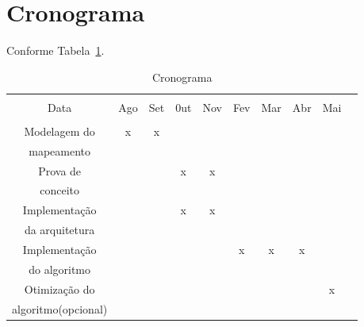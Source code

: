 \section{Cronograma}

Conforme Tabela~\ref{tab:crono}.
\begin{table}[Ht!]
   \begin{center}
     \begin{tabular}{|c|c|c|c|c|c|c|c|c|c|}
       \hline
                         &      &     &     &     &     &     &     &         \\
           Data          &  Ago & Set & 0ut & Nov & Fev & Mar & Abr & Mai      \\
                         &      &     &     &     &     &     &     &         \\
       \hline                                                                 
       Modelagem do      &   x  &  x  &     &     &     &     &     &         \\
       mapeamento        &      &     &     &     &     &     &     &         \\
       \hline                                                                 
       Prova de          &      &     &  x  &  x  &     &     &     &         \\
       conceito          &      &     &     &     &     &     &     &         \\
       \hline                                                                 
       Implementação     &      &     &  x  &  x  &     &     &     &         \\
       da arquitetura    &      &     &     &     &     &     &     &         \\
       \hline                                                                 
       Implementação     &      &     &     &     &  x  &  x  &  x  &         \\
       do algoritmo      &      &     &     &     &     &     &     &         \\
       \hline                                                                 
       Otimização do     &      &     &     &     &     &     &     &   x     \\
       algoritmo(opcional)&      &     &     &     &     &     &     &         \\
       \hline
     \end{tabular}
   \caption{Cronograma}
   \label{tab:crono}
   \end{center}
 \end{table}

